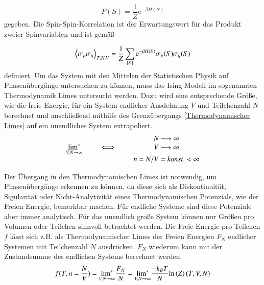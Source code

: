 \begin{equation} \label{eq: konfigProb}
    P(S) = \frac{1}{Z} \mathrm{e}^{-\beta H( S ) } 
\end{equation}
 gegeben. Die Spin-Spin-Korrelation ist der Erwartungswert für das Produkt zweier Spinvariablen und ist gemäß
 
\begin{equation} \label{def: sp_erwartungswert}
    \left\langle \sigma_{p} \sigma_{q} \right\rangle_{T,N,V} = \frac{1}{Z} \sum_{\{S\}} \mathrm{e}^{-\beta H( S ) }  \sigma_{p}( S ) \sigma_{q}( S )
\end{equation}
 definiert. \cite{StatPhys_Nolting_K2} Um das System mit den Mittelen der Statistischen Physik auf Phasenübergänge untersuchen zu können, muss das Ising-Modell im sogenannten Thermodynamik Limes untersucht werden. Dazu wird eine entsprechende Größe, wie die freie Energie, für ein System endlicher Ausdehnung $V$ und Teilchenzahl $N$ berechnet und anschließend mithilfe des Grenzübergangs \eqref{Thermodynamischer Limes} auf ein unendliches System extrapoliert. 
\begin{equation} \label{Thermodynamischer Limes}
\centering
\begin{tabular}{lccccc}
        &  &                 &    &      $N \longrightarrow \infty$\\
$\tlim$ &  &  $\iff$           &   &      $V \longrightarrow \infty$ \\
        &  &                 &   & $n =  N/V = konst. < \infty$
\end{tabular}
\end{equation}

\noindent Der Übergang in den Thermodynamischen Limes ist notwendig, um  Phasenübergänge erkennen zu können, da diese sich als Diskontinuität, Sigularität oder Nicht-Analytizität eines Thermodynamischen Potenzials, wie der Freien Energie, bemerkbar machen. Für endliche Systeme sind diese Potenziale aber immer analytisch. Für das unendlich große System können nur Größen pro Volumen oder Teilchen sinnvoll betrachtet werden. Die Freie Energie pro Teilchen $f$ lässt sich z.B. als Thermodynamischer Limes der Freien Energien $F_N$ endlicher Systemen mit Teilchenzahl $N$ ausdrücken. $F_N$ wiederum kann mit der Zustandsumme des endlichen Systems berechnet werden. \cite{StatPhys_Nolting_K4} 
\begin{equation} \label{SP_FreieEnergie}
f(T,n = \frac{N}{V}) = \underset{V,N \to \infty}{\text{lim}^{*}} \frac{F_N}{N} = \underset{V,N \to \infty}{\text{lim}^{*}} \frac{-k_B T}{N} \mathrm{ln}\left( Z \right)(T,V,N) 
\end{equation}

